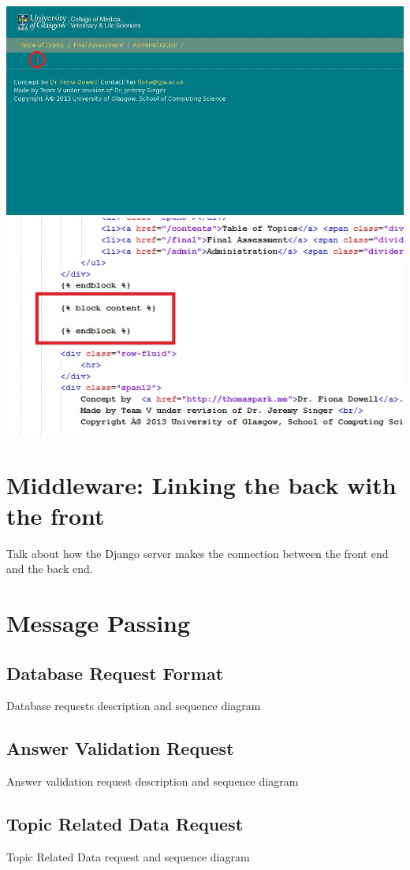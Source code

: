 \documentclass{l3proj}
\begin{document}
{\includegraphics[width=\linewidth]{images/base.jpg}
\includegraphics[width=\linewidth]{images/baseblock.jpg}
\section{Middleware: Linking the back with the front}
Talk about how the Django server makes the connection between the front end and the back end.
\section{Message Passing}
\subsection{Database Request Format}
Database requests description and sequence diagram
\subsection{Answer Validation Request}
Answer validation request description and sequence diagram
\subsection{Topic Related Data Request}
Topic Related Data request and sequence diagram
}
\end{document}
